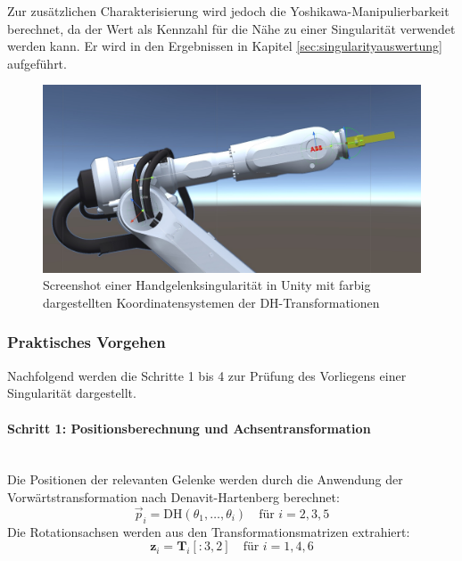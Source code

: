 Zur zusätzlichen Charakterisierung wird jedoch die Yoshikawa-Manipulierbarkeit
berechnet, da der Wert als Kennzahl für die Nähe zu einer Singularität verwendet
werden kann. Er wird in den Ergebnissen in Kapitel
\ref{sec:singularityauswertung} aufgeführt.

\begin{figure}[H]
  \centering
  \includegraphics[width=\linewidth]{Figures/wristSingularityScreenshot.jpg}
  \caption{Screenshot einer Handgelenksingularität in Unity mit farbig
  dargestellten Koordinatensystemen der DH-Transformationen}
  \label{figure:wristSingularity}
\end{figure}

\subsubsection{Praktisches Vorgehen} \label{sssec:Framework_Implementierung}
Nachfolgend werden die Schritte 1 bis 4 zur Prüfung des Vorliegens
einer Singularität dargestellt.

\paragraph{Schritt 1: Positionsberechnung und Achsentransformation}~\\
Die Positionen der relevanten Gelenke werden durch die Anwendung der
Vorwärtstransformation nach Denavit-Hartenberg berechnet:
\begin{equation}
  \vec{p}_i = \text{DH}(\theta_1, \ldots, \theta_i) \quad \text{für }
  i = 2, 3, 5
  \label{eq:position_calculation}
\end{equation}
\noindent
Die Rotationsachsen werden aus den Transformationsmatrizen extrahiert:
\begin{equation}
  \mathbf{z}_i = \mathbf{T}_i[:3, 2] \quad \text{für } i = 1, 4, 6
  \label{eq:axis_extraction}
\end{equation}

